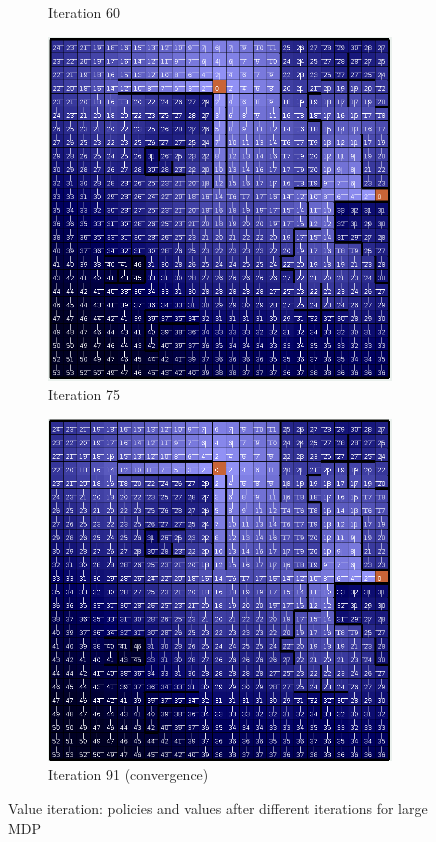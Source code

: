\documentclass[letterpaper]{article}
\begin{document}
\begin{figure}
\begin{subfigure}{.3\textwidth}
			\caption{Iteration 60}
		\end{subfigure}
		\begin{subfigure}{.3\textwidth}
			\centering
			\includegraphics[width=\linewidth]{images/big_vi_75}
			\caption{Iteration 75}
		\end{subfigure}
		\begin{subfigure}{.3\textwidth}
			\centering
			\includegraphics[width=\linewidth]{images/big_vi_91}
			\caption{Iteration 91 (convergence)}
		\end{subfigure}
		\caption{Value iteration: policies and values after different iterations for large MDP}
		\label{fig:mdp-vi-iter-large}%
	\end{figure}%
\end{document}
